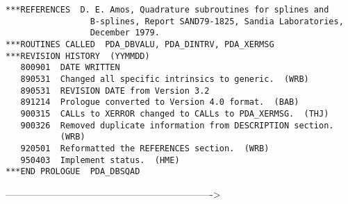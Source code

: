 \begin{verbatim}
***REFERENCES  D. E. Amos, Quadrature subroutines for splines and
                 B-splines, Report SAND79-1825, Sandia Laboratories,
                 December 1979.
***ROUTINES CALLED  PDA_DBVALU, PDA_DINTRV, PDA_XERMSG
***REVISION HISTORY  (YYMMDD)
   800901  DATE WRITTEN
   890531  Changed all specific intrinsics to generic.  (WRB)
   890531  REVISION DATE from Version 3.2
   891214  Prologue converted to Version 4.0 format.  (BAB)
   900315  CALLs to XERROR changed to CALLs to PDA_XERMSG.  (THJ)
   900326  Removed duplicate information from DESCRIPTION section.
           (WRB)
   920501  Reformatted the REFERENCES section.  (WRB)
   950403  Implement status.  (HME)
***END PROLOGUE  PDA_DBSQAD
\end{verbatim}

    ---------------------------------------------------------------->
 

